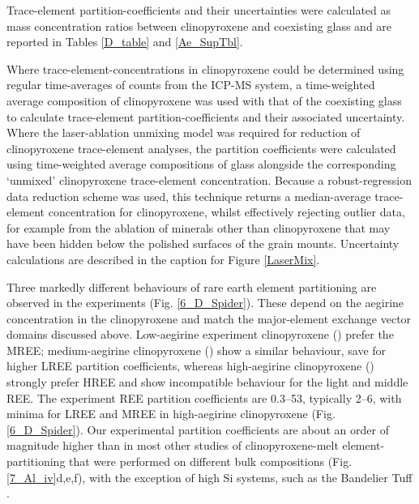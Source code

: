 \documentclass[final,authoryear,3p,times,twocolumn]{elsarticle}
\begin{document}
Trace-element partition-coefficients and their uncertainties were calculated as mass concentration ratios between clinopyroxene and coexisting glass and 
 are reported in Tables \ref{D_table} and \ref{Ae_SupTbl}. 


 Where trace-element-concentrations in clinopyroxene could be determined using regular time-averages of counts from the ICP-MS system, a time-weighted average composition of clinopyroxene was used with that of the coexisting glass to calculate trace-element partition-coefficients and their associated uncertainty. Where the laser-ablation unmixing model was required for reduction of clinopyroxene trace-element analyses, the partition coefficients were calculated using time-weighted average compositions of glass alongside the corresponding `unmixed' clinopyroxene trace-element concentration. Because a robust-regression data reduction scheme was used, this technique returns a median-average trace-element concentration for clinopyroxene, whilst effectively rejecting outlier data, for example from the ablation of minerals other than clinopyroxene that may have been hidden below the polished surfaces of the grain mounts. Uncertainty calculations are described in the caption for Figure \ref{LaserMix}.

 Three markedly different behaviours of rare earth element partitioning are observed in the experiments (Fig. \ref{6_D_Spider}). These depend on the aegirine concentration in the clinopyroxene and match the major-element exchange vector domains discussed above. Low-aegirine experiment clinopyroxene () prefer the MREE; medium-aegirine clinopyroxene () show a similar behaviour, save for higher LREE partition coefficients, whereas high-aegirine clinopyroxene () strongly prefer HREE and show incompatible behaviour for the light and middle REE. The experiment REE partition coefficients are 0.3--53, typically 2--6, with minima for LREE and MREE in high-aegirine clinopyroxene (Fig. \ref{6_D_Spider}). Our experimental partition coefficients are about an order of magnitude higher than in most other studies of clinopyroxene-melt element-partitioning that were performed on different bulk compositions (Fig. \ref{7_Al_iv}d,e,f), with the exception of high Si systems, such as the Bandelier Tuff \citep[cf.][]{Olin2010}.
\end{document}
